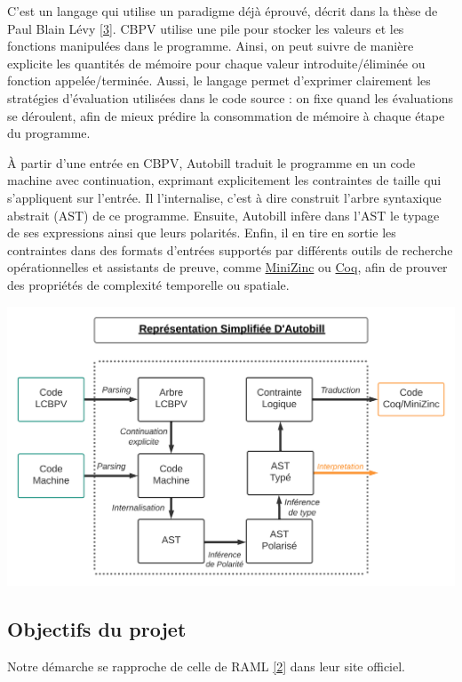 \documentclass[
  12pt,
]{article}
\begin{document}
C'est un langage qui utilise un paradigme déjà éprouvé, décrit dans la
thèse de Paul Blain Lévy \protect\hyperlink{biblio}{{[}3{]}}. CBPV
utilise une pile pour stocker les valeurs et les fonctions manipulées
dans le programme. Ainsi, on peut suivre de manière explicite les
quantités de mémoire pour chaque valeur introduite/éliminée ou fonction
appelée/terminée. Aussi, le langage permet d'exprimer clairement les
stratégies d'évaluation utilisées dans le code source : on fixe quand
les évaluations se déroulent, afin de mieux prédire la consommation de
mémoire à chaque étape du programme.

À partir d'une entrée en CBPV, Autobill traduit le programme en un code
machine avec continuation, exprimant explicitement les contraintes de
taille qui s'appliquent sur l'entrée. Il l'internalise, c'est à dire
construit l'arbre syntaxique abstrait (AST) de ce programme. Ensuite,
Autobill infère dans l'AST le typage de ses expressions ainsi que leurs
polarités. Enfin, il en tire en sortie les contraintes dans des formats
d'entrées supportés par différents outils de recherche opérationnelles
et assistants de preuve, comme
\href{https://www.minizinc.org/}{MiniZinc} ou
\href{https://coq.inria.fr/}{Coq}, afin de prouver des propriétés de
complexité temporelle ou spatiale.

\includegraphics{./MarkdownVersions/Rapport/Schema_Autobill.png}

\hypertarget{objectifs-du-projet}{%
\subsection{Objectifs du projet}\label{objectifs-du-projet}}

Notre démarche se rapproche de celle de RAML
\protect\hyperlink{biblio}{{[}2{]}} dans leur site officiel.
\end{document}
